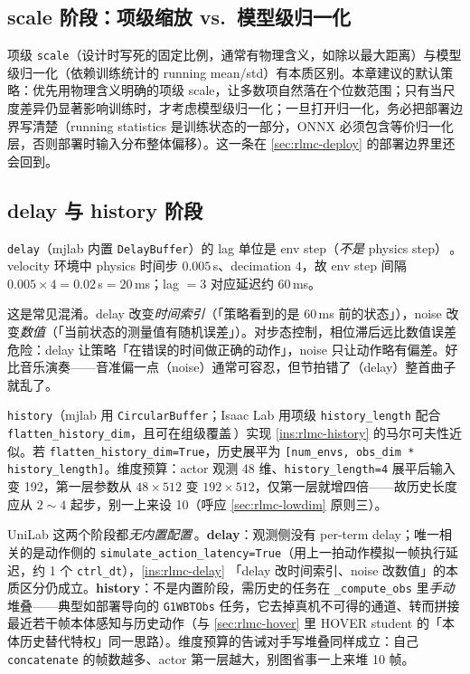 \subsection{scale 阶段：项级缩放 vs.\ 模型级归一化}
\label{sec:rlmc-scale}

项级 \verb|scale|（设计时写死的固定比例，通常有物理含义，如除以最大距离）与模型级归一化（依赖训练统计的 running mean/std）有本质区别。本章建议的默认策略：优先用物理含义明确的项级 scale，让多数项自然落在个位数范围；只有当尺度差异仍显著影响训练时，才考虑模型级归一化；一旦打开归一化，务必把部署边界写清楚（running statistics 是训练状态的一部分，ONNX 必须包含等价归一化层，否则部署时输入分布整体偏移）。这一条在 \cref{sec:rlmc-deploy} 的部署边界里还会回到。

\subsection{delay 与 history 阶段}
\label{sec:rlmc-delay-history}

\verb|delay|（mjlab 内置 \verb|DelayBuffer|）的 lag 单位是 env step（\emph{不是} physics step）\,\cite{mjlab2026}。velocity 环境中 physics 时间步 $0.005\,$s、decimation $4$，故 env step 间隔 $0.005\times4=0.02\,$s$=20\,$ms；lag $=3$ 对应延迟约 $60\,$ms。

\begin{insight}\label{ins:rlmc-delay}
这是常见混淆。delay 改变\emph{时间索引}（「策略看到的是 $60\,$ms 前的状态」），noise 改变\emph{数值}（「当前状态的测量值有随机误差」）。对步态控制，相位滞后远比数值误差危险：delay 让策略「在错误的时间做正确的动作」，noise 只让动作略有偏差。好比音乐演奏——音准偏一点（noise）通常可容忍，但节拍错了（delay）整首曲子就乱了。
\end{insight}

\verb|history|（mjlab 用 \verb|CircularBuffer|；Isaac Lab 用项级 \verb|history_length| 配合 \verb|flatten_history_dim|，且可在组级覆盖\,\cite{isaaclab2024,mjlab2026}）实现 \cref{ins:rlmc-history} 的马尔可夫性近似。若 \verb|flatten_history_dim=True|，历史展平为 \verb|[num_envs, obs_dim * history_length]|。维度预算：actor 观测 48 维、\verb|history_length=4| 展平后输入变 192，第一层参数从 $48\times512$ 变 $192\times512$，仅第一层就增四倍——故历史长度应从 $2\!\sim\!4$ 起步，别一上来设 10（呼应 \cref{sec:rlmc-lowdim} 原则三）。

UniLab 这两个阶段都\emph{无内置配置}\,\cite{unilab2026}。\textbf{delay}：观测侧没有 per-term delay；唯一相关的是动作侧的 \verb|simulate_action_latency=True|（用上一拍动作模拟一帧执行延迟，约 1 个 \verb|ctrl_dt|），\cref{ins:rlmc-delay} 「delay 改时间索引、noise 改数值」的本质区分仍成立。\textbf{history}：不是内置阶段，需历史的任务在 \verb|_compute_obs| 里\emph{手动}堆叠——典型如部署导向的 \verb|G1WBTObs| 任务，它去掉真机不可得的通道、转而拼接最近若干帧本体感知与历史动作（与 \cref{sec:rlmc-hover} 里 HOVER student 的「本体历史替代特权」同一思路）。维度预算的告诫对手写堆叠同样成立：自己 \verb|concatenate| 的帧数越多、actor 第一层越大，别图省事一上来堆 10 帧。

